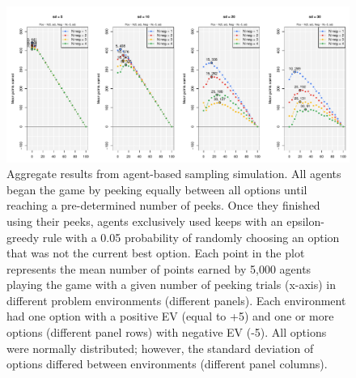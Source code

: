 \documentclass[a4paper,doc,natbib,floatsintext]{apa6}\usepackage[]{graphicx}\usepackage[]{color}
\begin{document}
\begin{figure}
\centering
\includegraphics[width=6in]{figures/optimal_result_points.pdf}
\caption{\label{fig:optimal}Aggregate results from agent-based sampling simulation. All agents began the game by peeking equally between all options until reaching a pre-determined number of peeks. Once they finished using their peeks, agents exclusively used keeps with an epsilon-greedy rule with a 0.05 probability of randomly choosing an option that was not the current best option. Each point in the plot represents the mean number of points earned by 5,000 agents playing the game with a given number of peeking trials (x-axis) in different problem environments (different panels). Each environment had one option with a positive EV (equal to +5) and one or more options (different panel rows) with negative EV (-5). All options were normally distributed; however, the standard deviation of options differed between environments (different panel columns).}
\end{figure}
\end{document}
